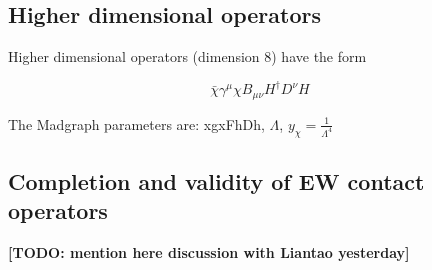 
\subsection{Higher dimensional operators}

Higher dimensional operators (dimension 8) have the form 

$$\bar{\chi} \gamma^{\mu} \chi B_{\mu \nu} H^{\dagger} D^{\nu} H$$

The Madgraph parameters are:
xgxFhDh, $\Lambda$, $y_{\chi} = \frac{1}{\Lambda^{4}}$	

%
%
%
%


\subsection{Completion and validity of EW contact operators}

\textbf{[TODO: mention here discussion with Liantao yesterday]}

